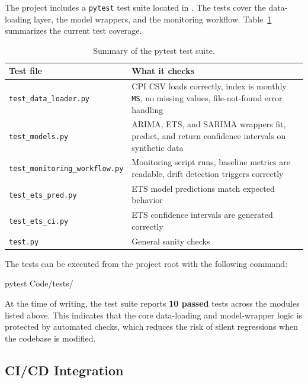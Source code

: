 The project includes a \texttt{pytest} test suite located in . The tests cover the data-loading layer, the model wrappers, and the monitoring workflow. Table~\ref{tab:test-suite-summary} summarizes the current test coverage.

\begin{table}[htbp]
    \centering
    \caption{Summary of the pytest test suite.}
    \label{tab:test-suite-summary}
    \begin{tabular}{p{4.5cm}p{8cm}}
        \hline
        \textbf{Test file} & \textbf{What it checks} \\
        \hline
        \texttt{test\_data\_loader.py} & CPI CSV loads correctly, index is monthly \texttt{MS}, no missing values, file-not-found error handling \\
        \texttt{test\_models.py} & ARIMA, ETS, and SARIMA wrappers fit, predict, and return confidence intervals on synthetic data \\
        \texttt{test\_monitoring\_workflow.py} & Monitoring script runs, baseline metrics are readable, drift detection triggers correctly \\
        \texttt{test\_ets\_pred.py} & ETS model predictions match expected behavior \\
        \texttt{test\_ets\_ci.py} & ETS confidence intervals are generated correctly \\
        \texttt{test.py} & General sanity checks \\
        \hline
    \end{tabular}
\end{table}

The tests can be executed from the project root with the following command:

\begin{Python}[caption={Running the pytest suite}, label={lst:run_pytest}]
pytest Code/tests/
\end{Python}

At the time of writing, the test suite reports \textbf{10 passed} tests across the modules listed above. This indicates that the core data-loading and model-wrapper logic is protected by automated checks, which reduces the risk of silent regressions when the codebase is modified.

\subsection{CI/CD Integration}

